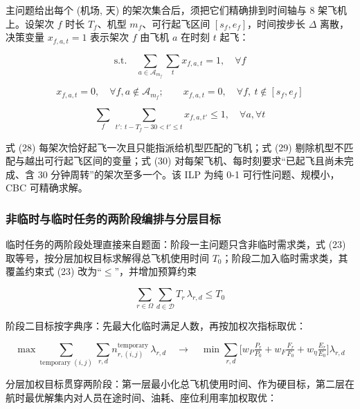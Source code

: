 \documentclass[UTF8,zihao=-4]{ctexart}
\numberwithin{figure}{section}
\numberwithin{table}{section}
\begin{document}
主问题给出每个 (机场, 天) 的架次集合后，须把它们精确排到时间轴与 8 架飞机上。设架次 $f$ 时长 $T_f$、机型 $m_f$、可行起飞区间 $[s_f,e_f]$，时间按步长 $\Delta$ 离散，决策变量 $x_{f,a,t}=1$ 表示架次 $f$ 由飞机 $a$ 在时刻 $t$ 起飞：

\begin{equation}
  \text{s.t.}\quad \sum_{a\in\mathcal{A}_{m_f}}\sum_{t} x_{f,a,t} = 1,\quad \forall f
\end{equation}

\begin{equation}
  x_{f,a,t}=0,\quad \forall f,a\notin\mathcal{A}_{m_f};\qquad x_{f,a,t}=0,\quad \forall f,\ t\notin[s_f,e_f]
\end{equation}

\begin{equation}
  \sum_{f}\ \sum_{t':\ t-T_f-30 < t'\le t} x_{f,a,t'} \le 1,\quad \forall a,\forall t
\end{equation}

式 (28) 每架次恰好起飞一次且只能指派给机型匹配的飞机；式 (29) 剔除机型不匹配与越出可行起飞区间的变量；式 (30) 对每架飞机、每时刻要求“已起飞且尚未完成、含 30 分钟周转”的架次至多一个。该 ILP 为纯 0-1 可行性问题、规模小，CBC 可精确求解。

\subsubsection{非临时与临时任务的两阶段编排与分层目标}

临时任务的两阶段处理直接来自题面：阶段一主问题只含非临时需求类，式 (23) 取等号，按分层加权目标求解得总飞机使用时间 $T_0$；阶段二加入临时需求类，其覆盖约束式 (23) 改为“$\le$”，并增加预算约束

\begin{equation}
  \sum_{r\in\Omega}\sum_{d\in\mathcal{D}} T_r\,\lambda_{r,d} \le T_0
\end{equation}

阶段二目标按字典序：先最大化临时满足人数，再按加权次指标取优：

\begin{equation}
  \max \sum_{\text{temporary }(i,j)}\sum_{r,d} n_{r,(i,j)}^{\text{temporary}}\,\lambda_{r,d}
  \quad\to\quad \min \sum_{r,d}\Big[w_P\tfrac{P_r}{P_0}+w_F\tfrac{F_r}{F_0}+w_\eta\tfrac{E_r}{E_0}\Big]\lambda_{r,d}
\end{equation}

分层加权目标贯穿两阶段：第一层最小化总飞机使用时间、作为硬目标，第二层在航时最优解集内对人员在途时间、油耗、座位利用率加权取优：
\end{document}
